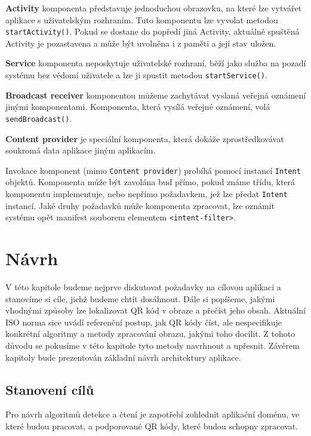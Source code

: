 \bigskip \textbf{Activity} komponenta představuje jednoduchou
obrazovku, na které lze vytvářet aplikace s uživatelským rozhraním. Tuto
komponentu lze vyvolat metodou \texttt{startActivity()}. Pokud se dostane do
popředí jiná Activity, aktuálně spuštěná Activity je pozastavena a může být uvolněna i z paměti a její stav uložen.

\bigskip \textbf{Service} komponenta neposkytuje uživatelské rozhraní,
běží jako služba na pozadí systému bez vědomí uživatele a lze ji spustit metodou
\texttt{startService()}.

\bigskip \textbf{Broadcast receiver} komponentou můžeme zachytávat
vyslaná veřejná oznámení jinými komponentami. Komponenta, která vysílá veřejné
oznámení, volá \texttt{sendBroadcast()}.

\bigskip \textbf{Content provider} je speciální komponenta, která
dokáže zprostředkovávat soukromá data aplikace jiným aplikacím.

\bigskip Invokace komponent (mimo \texttt{Content provider}) probíhá pomocí
instancí \texttt{Intent} objektů. Komponenta může být zavolána buď přímo, pokud
známe třídu, která komponentu implementuje, nebo nepřímo požadavkem, jež lze 
předat \texttt{Intent} instancí. Jaké druhy požadavků může komponenta zpracovat,
lze oznámit systému opět manifest souborem elementem \texttt{<intent-filter>}.


\chapter{Návrh}
\label{navrh}

V této kapitole budeme nejprve diskutovat požadavky na cílovou aplikaci a
stanovíme si cíle, jichž budeme chtít dosáhnout. Dále si popíšeme, jakými 
vhodnými způsoby lze lokalizovat QR kód v obraze a přečíst jeho obsah. 
Aktuální ISO norma sice uvádí referenční postup, jak QR kódy číst, ale
nespecifikuje konkrétní algoritmy a metody zpracování obrazu, jakými toho
docílit.
Z tohoto důvodu se pokusíme v této kapitole tyto metody navrhnout a upřesnit. Závěrem
kapitoly bude prezentován základní návrh architektury aplikace.

\section{Stanovení cílů}

Pro návrh algoritmů detekce a čtení je zapotřebí zohlednit aplikační doménu, ve
které budou pracovat, a podporované QR kódy, které budou schopny zpracovat.

